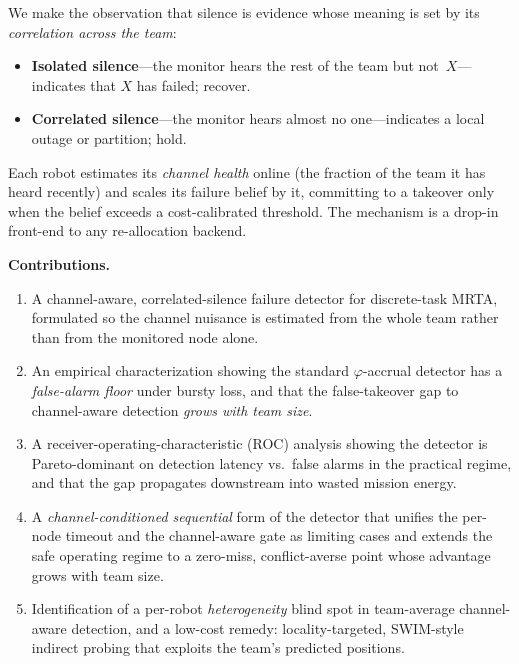 \documentclass[conference]{IEEEtran}
\begin{document}
We make the observation that silence is evidence whose meaning is set by its
\emph{correlation across the team}:
\begin{itemize}
\item \textbf{Isolated silence}---the monitor hears the rest of the team but
not~$X$---indicates that $X$ has failed; recover.
\item \textbf{Correlated silence}---the monitor hears almost no
one---indicates a local outage or partition; hold.
\end{itemize}
Each robot estimates its \emph{channel health} online (the fraction of the team
it has heard recently) and scales its failure belief by it, committing to a
takeover only when the belief exceeds a cost-calibrated threshold. The
mechanism is a drop-in front-end to any re-allocation backend.

\noindent\textbf{Contributions.}
\begin{enumerate}
\item A channel-aware, correlated-silence failure detector for discrete-task
MRTA, formulated so the channel nuisance is estimated from the whole team
rather than from the monitored node alone.
\item An empirical characterization showing the standard $\varphi$-accrual
detector has a \emph{false-alarm floor} under bursty loss, and that the
false-takeover gap to channel-aware detection \emph{grows with team size}.
\item A receiver-operating-characteristic (ROC) analysis showing the detector
is Pareto-dominant on detection latency vs.\ false alarms in the practical
regime, and that the gap propagates downstream into wasted mission energy.
\item A \emph{channel-conditioned sequential} form of the detector that unifies
the per-node timeout and the channel-aware gate as limiting cases and extends the
safe operating regime to a zero-miss, conflict-averse point whose advantage grows
with team size.
\item Identification of a per-robot \emph{heterogeneity} blind spot in
team-average channel-aware detection, and a low-cost remedy: locality-targeted,
SWIM-style indirect probing that exploits the team's predicted positions.
\end{enumerate}
\end{document}
